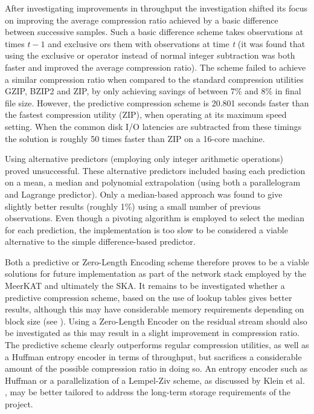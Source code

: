 After investigating improvements in throughput the investigation shifted its focus on improving the average compression ratio achieved by a basic difference between successive samples. Such a basic difference
scheme takes observations at times $t-1$ and exclusive ors them with observations at time \textit{t} (it was found that using the exclusive or operator instead of normal integer subtraction was both faster and improved the average
compression ratio). The scheme failed to achieve a similar compression ratio when compared to the standard compression utilities GZIP, BZIP2 and ZIP, by only achieving savings of between 7\% and 8\% in final file size.
However, the predictive compression scheme is 20.801 seconds faster than the fastest compression utility (ZIP), when operating at its maximum speed setting. When the common disk I/O latencies are subtracted from these 
timings the solution is roughly 50 times faster than ZIP on a 16-core machine.

Using alternative predictors (employing only integer arithmetic operations) proved unsuccessful. These alternative predictors included basing each prediction on a mean, a median and polynomial extrapolation (using both a 
parallelogram and Lagrange predictor). Only a median-based approach was found to give slightly better results (roughly 1\%) using a small number of previous observations. Even though a pivoting algorithm is employed to 
select the median for each prediction, the implementation is too slow to be considered a viable alternative to the simple difference-based predictor.

Both a predictive or Zero-Length Encoding scheme therefore proves to be a viable solutions for future implementation as part of the network stack employed by the MeerKAT and ultimately the SKA. It remains to be investigated whether a predictive 
compression scheme, based on the use of lookup tables gives better results, although this may have considerable memory requirements depending on block size (see \cite{1607248,4589203,4976448}). Using a Zero-Length Encoder on the residual
stream should also be investigated as this may result in a slight improvement in compression ratio. The predictive scheme clearly outperforms regular compression utilities, as well as a Huffman entropy encoder in terms of throughput, 
but sacrifices a considerable amount of the possible compression ratio in doing so. An entropy encoder such as Huffman or a parallelization of a Lempel-Ziv scheme, as discussed by Klein et al. \cite{klein2005parallel}, may be better tailored 
to address the long-term storage requirements of the project.


\glsaddall
\printglossary
